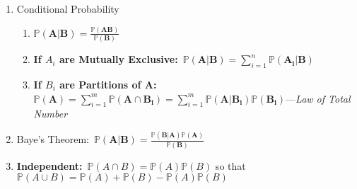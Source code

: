 \begin{enumerate}
\begin{enumerate}
    \end{enumerate}
    \item Conditional Probability
    \begin{enumerate}
        \item $\mathbb{P}(\mathbf{A|B}) = \frac{\mathbb{P}(\mathbf{AB})}{\mathbb{P}(\mathbf{B})}$
        \item \textbf{If $A_i$ are Mutually Exclusive:}~$\mathbb{P}(\mathbf{A|B}) = \sum_{i=1}^{n}\mathbb{P}(\mathbf{A_i|B})$ %
        \item \textbf{If $B_i$ are Partitions of A:}~$\mathbb{P}(\mathbf{A}) = \sum_{i=1}^{m}\mathbb{P}(\mathbf{A\cap B_i}) = \sum_{i=1}^{m}\mathbb{P}(\mathbf{A|B_i})\mathbb{P}(\mathbf{B_i})$---\textit{Law of Total Number}
    \end{enumerate}
    \item Baye's Theorem:~$\mathbb{P}(\mathbf{A|B}) = \frac{\mathbb{P}(\mathbf{B|A})\mathbb{P}(\mathbf{A})}{\mathbb{P}(\mathbf{B})}$
    \item \textbf{Independent:}~$\mathbb{P}(A\cap B)=\mathbb{P}(A)\mathbb{P}(B)$ so that $\mathbb{P}(A \cup B) = \mathbb{P}(A)+\mathbb{P}(B)-\mathbb{P}(A)\mathbb{P}(B)$
\end{enumerate}
